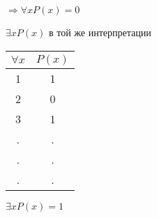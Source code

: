 \documentclass[russian]{lecture-notes}
\begin{document}
    $\Rightarrow \forall x P(x) = 0$

    $\exists x P(x)$ в той же интерпретации

    \begin{table}[h!]
                \centering
                \begin{tabular}{|c|c|}
                    \hline
                    $\forall x $ & $P(x)$ \\ \hline
                    1      & 1       \\ \hline
                    2      & 0       \\ \hline
                    3      & 1       \\ \hline
                    .      & .       \\ \hline
                    .      & .       \\ \hline
                    .      & .       \\ \hline
                \end{tabular}
            \end{table}

    $\exists x P(x) = 1$
\end{document}
